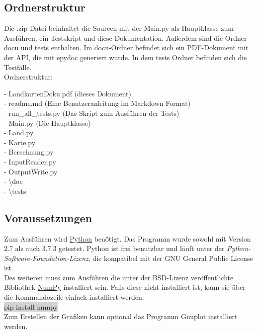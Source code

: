 \documentclass[a4paper,11pt]{article}
\begin{document}
{\subsection{Ordnerstruktur}
Die .zip Datei beinhaltet die Sourcen mit der Main.py als Hauptklasse zum Ausf\"uhren, ein Testskript und diese Dokumentation. Außerdem sind die Ordner \glqq docu\grqq{} und \glqq tests\grqq{} enthalten.
Im \glqq docu\grqq{}-Ordner befindet sich ein PDF-Dokument mit der API, die mit epydoc generiert wurde. In dem tests Ordner befinden sich die Testf\"alle.\\
\vspace{2mm}
Ordnerstruktur:\\
\begin{mdframed}[linewidth=0pt, backgroundcolor=background, innertopmargin=10pt, innerbottommargin=10pt]
	- LandkartenDoku.pdf (dieses Dokument)\\
	- readme.md (Eine Benutzeranleitung im Markdown Format)\\
	- run\_all\_tests.py (Das Skript zum Ausf\"uhren der Tests)\\
	- Main.py (Die Hauptklasse)\\
	- Land.py\\
	- Karte.py\\
	- Berechnung.py\\
	- InputReader.py\\
	- OutputWrite.py\\
	- \textbackslash doc\\
	- \textbackslash tests
\end{mdframed}
\subsection{Voraussetzungen}
Zum Ausf\"uhren wird \href{https://www.python.org/}{Python} ben\"otigt. Das Programm wurde sowohl mit Version 2.7 als auch 3.7.3 getestet. Python ist frei benutzbar und l\"auft unter der
\textit{Python-Software-Foundation-Lizenz}, die kompatibel mit der GNU General Public License ist.\\
Des weiteren muss zum Ausf\"uhren die unter der BSD-Lizenz ver\"offentlichte Bibliothek \href{https://www.numpy.org/}{NumPy} installiert sein.
Falls diese nicht installiert ist, kann sie \"uber die Kommandozeile einfach installiert werden:\\
\colorbox{lightgray}{pip install numpy}\\

Zum Erstellen der Grafiken kann optional das Programm Gnuplot installiert werden.

}
\end{document}
